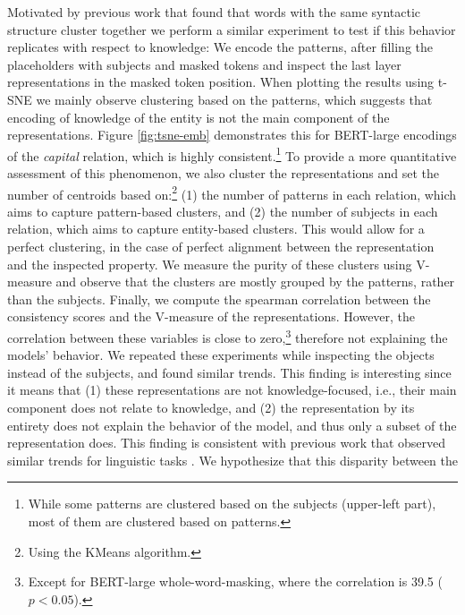 Motivated by previous work that found that words with the same syntactic structure cluster together \cite{chi-etal-2020-finding,ravfogel-etal-2020-unsupervised} we perform a similar experiment to test if this behavior replicates with respect to knowledge:
We encode the patterns, after filling the placeholders with subjects and masked tokens and inspect the last layer representations in the masked token position.
When plotting the results using t-SNE \cite{tsne} we mainly
observe clustering based on the patterns, which suggests
that encoding of knowledge of the entity is not the main component of the representations.
Figure \ref{fig:tsne-emb} demonstrates
this for BERT-large encodings of the \textit{capital} relation, which is highly consistent.\footnote{While some patterns are clustered based on the subjects (upper-left part), most of them are clustered based on patterns.}
To provide a more quantitative assessment of this phenomenon, 
we also cluster the representations and set the number of centroids based on:\footnote{Using the KMeans algorithm.} (1) the number of patterns in each relation, which aims to capture pattern-based clusters, and (2) the number of subjects in each relation, which aims to capture entity-based clusters. This would allow for a perfect clustering, in the case of perfect alignment between the representation and the inspected property.
We measure the purity of these clusters using V-measure and observe that the clusters are mostly grouped by the patterns, rather than the subjects.
Finally, we compute the spearman correlation between the consistency scores and the V-measure of the representations.
However, the correlation between these variables is close to zero,\footnote{Except for BERT-large whole-word-masking, where the correlation is 39.5 ($p<0.05$).} therefore not explaining the models' behavior.
We repeated these experiments while inspecting the objects instead of the subjects, and found similar trends.
This finding is interesting since it means that (1) these representations are not knowledge-focused, i.e., their main component does not relate to knowledge, and (2) the representation by its entirety does not explain the behavior of the model, and thus only a subset of the representation does. %
This finding is consistent with previous work that observed similar trends for linguistic tasks \cite{amnesic_probing}.
We hypothesize that this disparity between the
